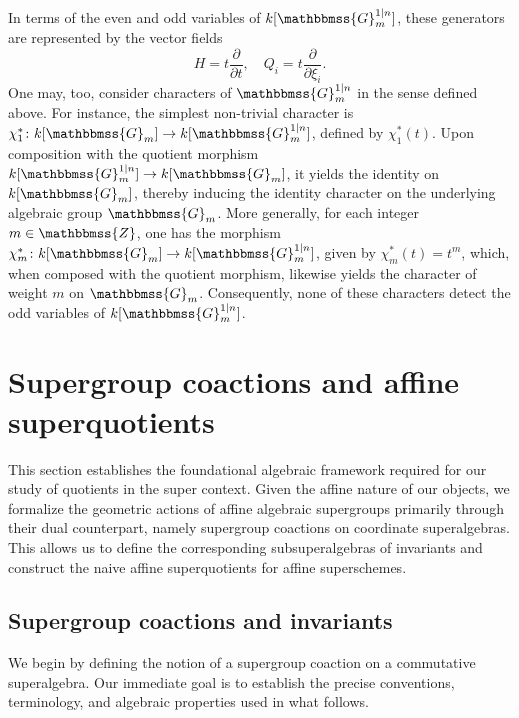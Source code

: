 \documentclass[11pt,a4paper,reqno,noamsfonts]{amsart}
\numberwithin{equation}{section}
\theoremstyle{definition}
\theoremstyle{remark}
\newcommand{\GG}{\ensuremath{\mathbbmss{G}}}
\newcommand{\ZZ}{\ensuremath{\mathbbmss{Z}}}
\begin{document}
In terms of the even and odd variables of $k[\GG_m^{1\vert n}]$, these generators are represented by the vector fields
\begin{equation}
H = t \frac{\partial}{\partial t}, \quad Q_i = t\frac{\partial}{\partial \xi_i}. 
\end{equation}
One may, too, consider characters of $\GG_m^{1\vert n}$ in the sense defined above. For instance, the simplest non-trivial character is $\chi_1^* \colon k[\GG_m] \to k[\GG_m^{1\vert n}]$, defined by $\chi_1^*(t)$. Upon composition with the quotient morphism $k[\GG_m^{1\vert n}] \to k[\GG_m]$, it yields the identity on $k[\GG_m]$, thereby inducing the identity character on the underlying algebraic group $\GG_m$. More generally, for each integer $m \in \ZZ$, one has the morphism $\chi_m^* \colon k[\GG_m] \to k[\GG_m^{1\vert{}n}]$, given by $\chi_m^*(t) = t^m$, which, when composed with the quotient morphism, likewise yields the character of weight $m$ on $\GG_m$. Consequently, none of these characters detect the odd variables of $k[\GG_m^{1\vert n}]$.


\section{Supergroup coactions and affine superquotients}\label{sec:3}
This section establishes the foundational algebraic framework required for our study of quotients in the super context. Given the affine nature of our objects, we formalize the geometric actions of affine algebraic supergroups primarily through their dual counterpart, namely supergroup coactions on coordinate superalgebras. This allows us to define the corresponding subsuperalgebras of invariants and construct the naive affine superquotients for affine superschemes.

\subsection{Supergroup coactions and invariants}\label{sec:3.1}
We begin by defining the notion of a supergroup coaction on a commutative superalgebra. Our immediate goal is to establish the precise conventions, terminology, and algebraic properties used in what follows.
\end{document}
